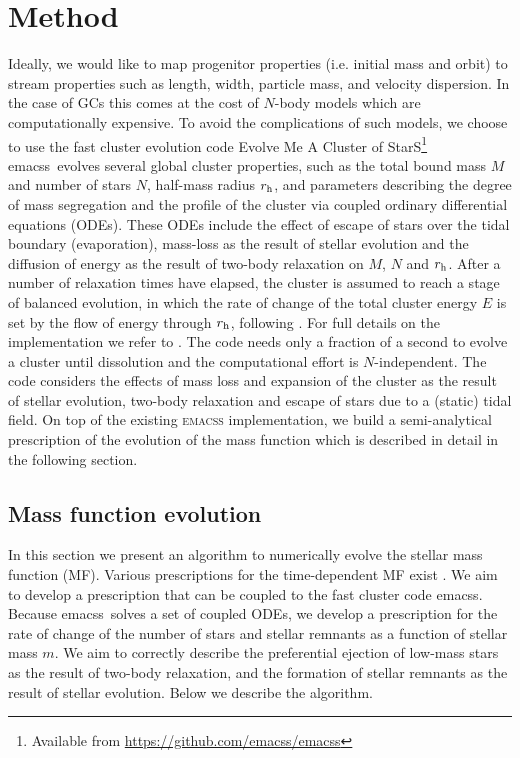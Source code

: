 \documentclass[useAMS,usenatbib,fleqn]{mnras}
\newcommand{\rh}{r_{\rm h}}
\newcommand{\comm}[1]{#1}
\newcommand{\emacss}{{\sc emacss}}
\begin{document}
\section{Method}
\label{sec:evolve_mf}
Ideally, we would like to map progenitor properties (i.e. initial mass and
orbit) to stream properties such as length, width, particle mass, and velocity
dispersion. In the case of GCs this comes at the cost of $N$-body models which
are computationally expensive. To avoid the complications of such models, we
choose to use the fast cluster evolution code Evolve Me A Cluster of
StarS\footnote{Available from
\href{https://github.com/emacss/emacss}{https://github.com/emacss/emacss}}
\citep[\textsc{emacss},][]{emacsscode, 2014MNRAS.437..916G, Alexander14}
\comm{\emacss\ evolves several global cluster properties, such as the total
bound mass $M$ and number of stars $N$, half-mass radius $\rh$, and parameters
describing the degree of mass segregation and the profile of the cluster via
coupled ordinary differential equations (ODEs). These ODEs include the effect of
escape of stars over the tidal boundary (evaporation), mass-loss as the result
of stellar evolution and the diffusion of energy as the result of two-body
relaxation on $M$, $N$ and $\rh$. After a number of relaxation times have
elapsed, the cluster is assumed to reach a stage of balanced evolution, in which
the rate of change of the total cluster energy $E$ is set by the flow of energy
through $\rh$, following \citet{H61}. For full details on the implementation we
refer to \citet{Alexander14}.} The code needs only a fraction of a second to
evolve a cluster until dissolution and the computational effort is
$N$-independent. The code considers the effects of mass loss and expansion of
the cluster as the result of stellar evolution, two-body relaxation and escape
of stars due to a (static) tidal field.  On top of the existing \textsc{emacss}
implementation, we build a semi-analytical prescription of the evolution of the
mass function which is described in detail in the following section.

\subsection{Mass function evolution}
In this section we present an algorithm to numerically evolve the stellar mass
function (MF). Various prescriptions for the time-dependent MF exist
\citep[e.g.][]{2009A&A...507.1409K,Lamers13}. We aim to develop a
prescription that can be coupled to the fast cluster code \emacss. Because
\emacss\ solves a set of coupled ODEs, we develop a prescription for the rate of
change of the number of stars and stellar remnants  as a function of stellar
mass $m$. We aim to correctly describe the preferential ejection of low-mass
stars as the result of two-body relaxation, and the formation of stellar
remnants as the result of stellar evolution. Below we describe the algorithm.
\end{document}
